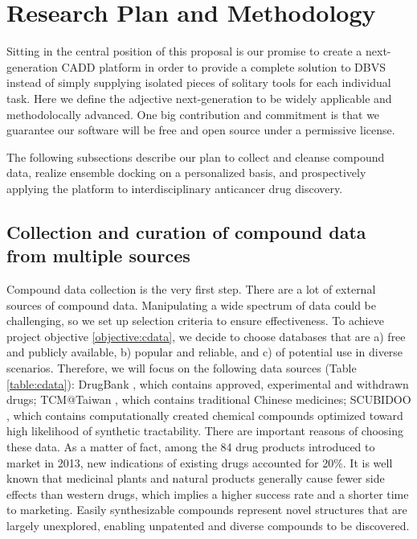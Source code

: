 \documentclass[a4paper,12pt]{article}
\begin{document}
\section*{Research Plan and Methodology}

Sitting in the central position of this proposal is our promise to create a next-generation CADD platform in order to provide a complete solution to DBVS instead of simply supplying isolated pieces of solitary tools for each individual task. Here we define the adjective next-generation to be widely applicable and methodolocally advanced. One big contribution and commitment is that we guarantee our software will be free and open source under a permissive license.

The following subsections describe our plan to collect and cleanse compound data, realize ensemble docking on a personalized basis, and prospectively applying the platform to interdisciplinary anticancer drug discovery.

\subsection*{Collection and curation of compound data from multiple sources}

Compound data collection is the very first step. There are a lot of external sources of compound data. Manipulating a wide spectrum of data could be challenging, so we set up selection criteria to ensure effectiveness. To achieve project objective \ref{objective:cdata}, we decide to choose databases that are a) free and publicly available, b) popular and reliable, and c) of potential use in diverse scenarios. Therefore, we will focus on the following data sources (Table \ref{table:cdata}): DrugBank \citep{1594}, which contains approved, experimental and withdrawn drugs; TCM@Taiwan \citep{528}, which contains traditional Chinese medicines; SCUBIDOO \citep{1682}, which contains computationally created chemical compounds optimized toward high likelihood of synthetic tractability. There are important reasons of choosing these data. As a matter of fact, among the 84 drug products introduced to market in 2013, new indications of existing drugs accounted for 20\%. It is well known that medicinal plants and natural products generally cause fewer side effects than western drugs, which implies a higher success rate and a shorter time to marketing. Easily synthesizable compounds represent novel structures that are largely unexplored, enabling unpatented and diverse compounds to be discovered.
\end{document}
